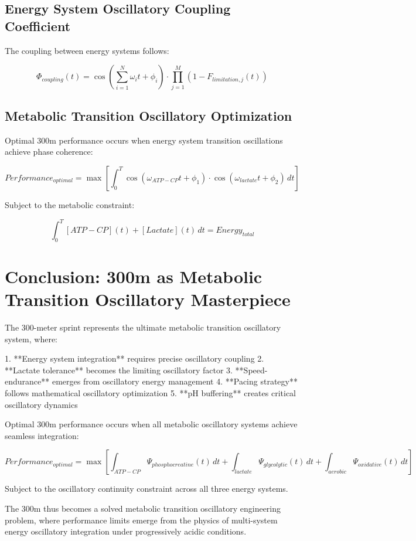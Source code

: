 \documentclass[12pt]{article}
\begin{document}
\subsection{Energy System Oscillatory Coupling Coefficient}

The coupling between energy systems follows:

\begin{equation}
\Phi_{coupling}(t) = \cos\left(\sum_{i=1}^{N} \omega_i t + \phi_i\right) \cdot \prod_{j=1}^{M} \left(1 - F_{limitation,j}(t)\right)
\end{equation}

\subsection{Metabolic Transition Oscillatory Optimization}

Optimal 300m performance occurs when energy system transition oscillations achieve phase coherence:

\begin{equation}
Performance_{optimal} = \max\left[\int_0^{T} \cos(\omega_{ATP-CP}t + \phi_1) \cdot \cos(\omega_{lactate}t + \phi_2) \, dt\right]
\end{equation}

Subject to the metabolic constraint:

\begin{equation}
\int_0^{T} [ATP-CP](t) + [Lactate](t) \, dt = Energy_{total}
\end{equation}

\section{Conclusion: 300m as Metabolic Transition Oscillatory Masterpiece}

The 300-meter sprint represents the ultimate metabolic transition oscillatory system, where:

1. **Energy system integration** requires precise oscillatory coupling
2. **Lactate tolerance** becomes the limiting oscillatory factor
3. **Speed-endurance** emerges from oscillatory energy management
4. **Pacing strategy** follows mathematical oscillatory optimization
5. **pH buffering** creates critical oscillatory dynamics

Optimal 300m performance occurs when all metabolic oscillatory systems achieve seamless integration:

\begin{equation}
Performance_{optimal} = \max\left[\int_{ATP-CP} \Psi_{phosphocreatine}(t) \, dt + \int_{lactate} \Psi_{glycolytic}(t) \, dt + \int_{aerobic} \Psi_{oxidative}(t) \, dt\right]
\end{equation}

Subject to the oscillatory continuity constraint across all three energy systems.

The 300m thus becomes a solved metabolic transition oscillatory engineering problem, where performance limits emerge from the physics of multi-system energy oscillatory integration under progressively acidic conditions.
\end{document}
